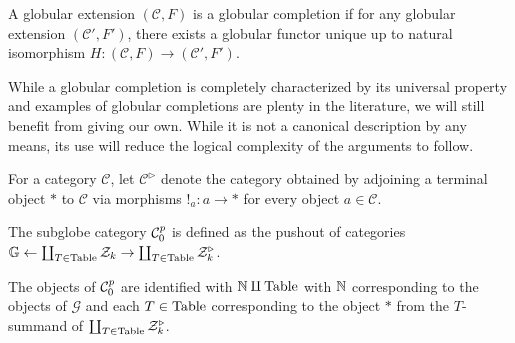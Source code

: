 A globular extension $(\mathcal{C}, F)$ is a globular completion if for any globular extension $(\mathcal{C}', F')$, there exists a globular functor unique up to natural isomorphism $H \colon (\mathcal{C}, F) \to (\mathcal{C}', F')$.

While a globular completion is completely characterized by its universal property and examples of globular completions are plenty in the literature, we will still benefit from giving our own. While it is not a canonical description by any means, its use will reduce the logical complexity of the arguments to follow. 

For a category $\mathcal{C}$, let $\mathcal{C}^{\triangleright}$ denote the category obtained by adjoining a terminal object $*$ to $\mathcal{C}$ via morphisms $!_a \colon a \to *$ for every object $a \in \mathcal{C}$.  

The subglobe category $\mathcal{C}_0^p$ is defined as the pushout of categories $\mathbb{G} \leftarrow \coprod_{T \in \mathrm{Table}} \mathcal{Z}_k \rightarrow \coprod_{T \in \mathrm{Table}} \mathcal{Z}_k^{\triangleright}$.

The objects of $\mathcal{C}_0^p$ are identified with $\mathbb{N} \amalg \mathrm{Table}$ with $\mathbb{N}$ corresponding to the objects of $\mathcal{G}$ and each $T \in \mathrm{Table}$ corresponding to the object $*$ from the $T$-summand of $\coprod_{T \in \mathrm{Table}} \mathcal{Z}_k^{\triangleright}$.